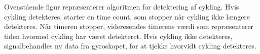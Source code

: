 Ovenstående figur repræsenterer algoritmen for detektering af cykling. Hvis cykling detekteres, starter en time count, som stopper når cykling ikke længere detekteres. Når timeren stopper, videresendes timerens værdi som repræsenterer tiden hvormed cykling har været detekteret. Hvis cykling ikke detekteres, signalbehandles ny data fra gyroskopet, for at tjekke hvorvidt cykling detekteres.

